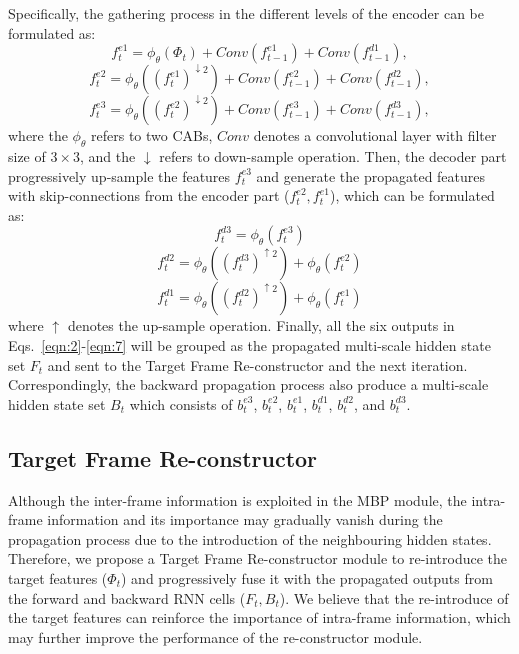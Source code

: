 \documentclass[letterpaper]{article} \usepackage{aaai22}  \usepackage{times}  \usepackage{helvet}  \usepackage{courier}  \usepackage[hyphens]{url}  \usepackage{graphicx} \urlstyle{rm} \def\UrlFont{\rm}  \usepackage{natbib}  \usepackage{caption} \DeclareCaptionStyle{ruled}{labelfont=normalfont,labelsep=colon,strut=off} \frenchspacing  \setlength{\pdfpagewidth}{8.5in}  \setlength{\pdfpageheight}{11in}  \newcommand{\hang}{\textcolor[rgb]{0.98,0.5,0.04}}
\begin{document}
Specifically, the gathering process in the different levels of the encoder can be formulated as:
\begin{equation}\label{eqn:2}
f^{e1}_{t} = \phi_\theta(\Phi_{t}) + Conv(f^{e1}_{t-1}) + Conv(f^{d1}_{t-1}),
\end{equation}
\begin{equation}\label{eqn:3}
f^{e2}_{t} = \phi_\theta((f^{e1}_{t})^{\downarrow 2}) + Conv(f^{e2}_{t-1}) + Conv(f^{d2}_{t-1}),
\end{equation}
\begin{equation}\label{eqn:4}
f^{e3}_{t} = \phi_\theta((f^{e2}_{t})^{\downarrow 2}) + Conv(f^{e3}_{t-1}) + Conv(f^{d3}_{t-1}),
\end{equation}
where the $\phi_\theta$ refers to two CABs, $Conv$ denotes a convolutional layer with filter size of $3 \times 3$, and the $\downarrow$ refers to down-sample operation.
Then, the decoder part progressively up-sample the features $f^{e3}_{t}$ and generate the propagated features with skip-connections from the encoder part ($f^{e2}_{t}, f^{e1}_{t}$),
which can be formulated as:
\begin{equation}\label{eqn:5}
f^{d3}_{t} = \phi_\theta(f^{e3}_{t})
\end{equation}
\begin{equation}\label{eqn:6}
f^{d2}_{t} = \phi_\theta((f^{d3}_{t})^{\uparrow 2}) + \phi_\theta(f^{e2}_{t})
\end{equation}
\begin{equation}\label{eqn:7}
f^{d1}_{t} = \phi_\theta((f^{d2}_{t})^{\uparrow 2}) + \phi_\theta(f^{e1}_{t})
\end{equation}
where $\uparrow$ denotes the up-sample operation.
Finally, all the six outputs in Eqs.~\eqref{eqn:2}-\eqref{eqn:7} will be grouped as the propagated multi-scale hidden state set $F_t$ and sent to the Target Frame Re-constructor and the next iteration.
Correspondingly, the backward propagation process also produce a multi-scale hidden state set $B_t$ which consists of $b^{e3}_{t}$, $b^{e2}_{t}$, $b^{e1}_{t}$, $b^{d1}_{t}$, $b^{d2}_{t}$, and $b^{d3}_{t}$.


\subsection{Target Frame Re-constructor}
\vspace{-1mm}
Although the inter-frame information is exploited in the MBP module, 
the intra-frame information and its importance may gradually vanish during the propagation process due to the introduction of the neighbouring hidden states.
Therefore, we propose a Target Frame Re-constructor module to re-introduce the target features ($\Phi_t$) and progressively fuse it with the propagated outputs from the forward and backward RNN cells ($F_t, B_t$).
We believe that the re-introduce of the target features can reinforce the importance of intra-frame information, which may further improve the performance of the re-constructor module.
\end{document}

